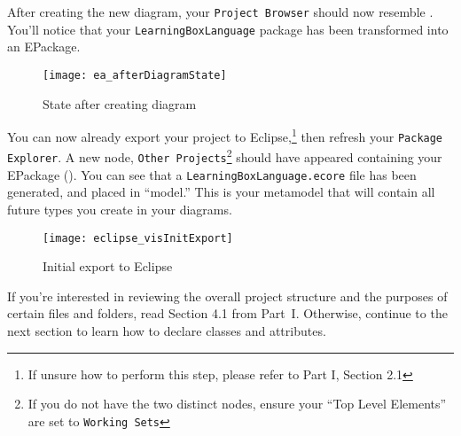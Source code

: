 \begin{stepbystep}
 
\item After creating the new diagram, your  \texttt{Project Browser} should now resemble . You'll notice
that your \texttt{LearningBoxLanguage} package has been transformed into an EPackage.

\begin{figure}[htbp]
	\centering
  \texttt{[image: ea\_afterDiagramState]}
	\caption{State after creating diagram}
	\label{ea:diagramComplete}
\end{figure}
\FloatBarrier

\item You can now already export your project to Eclipse,\footnote{If unsure how to perform this step, please refer to Part I, Section
2.1} then refresh your \texttt{Package Explorer}. A new node, \texttt{Other Projects}\footnote{If you do not have the two distinct nodes, ensure your ``Top
Level Elements'' are set to \texttt{Working Sets}} should have appeared containing your EPackage (). You can see that a
\texttt{Lear\-ning\-Box\-Lan\-guage.\-ecore} file has been generated, and placed in ``model.'' This is your metamodel that will contain all future types you create in
your diagrams.

\clearpage

\vspace*{2cm}

\begin{figure}[htbp]
	\centering
  \texttt{[image: eclipse\_visInitExport]}
	\caption{Initial export to Eclipse}
	\label{eclipse:initExport}
\end{figure}

\vspace{1cm}

\item If you're interested in reviewing the overall project structure and the purposes of certain files and folders, read Section 4.1
from Part~I. Otherwise, continue to the next section to learn how to declare classes and attributes.

\end{stepbystep}
